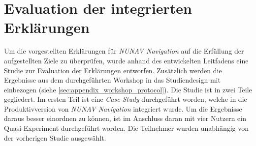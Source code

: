 \section{Evaluation der integrierten Erklärungen}
\label{sec:02_evaluation_explanations}

Um die vorgestellten Erklärungen für \textit{NUNAV Navigation} auf die Erfüllung der aufgestellten Ziele zu überprüfen, wurde anhand des entwickelten Leitfadens eine Studie zur Evaluation der Erklärungen entworfen. Zusätzlich werden die Ergebnisse aus dem durchgeführten Workshop in das Studiendesign mit einbezogen (siehe \autoref{sec:appendix_workshop_protocol}). Die Studie ist in zwei Teile gegliedert. Im ersten Teil ist eine \textit{Case Study} \cite{wohlin2012experimentation} durchgeführt worden, welche in die Produktivversion von \textit{NUNAV Navigation} integriert wurde. Um die Ergebnisse daraus besser einordnen zu können, ist im Anschluss daran mit vier Nutzern ein Quasi-Experiment \cite{wohlin2012experimentation} durchgeführt worden. Die Teilnehmer wurden unabhängig von der vorherigen Studie ausgewählt.









